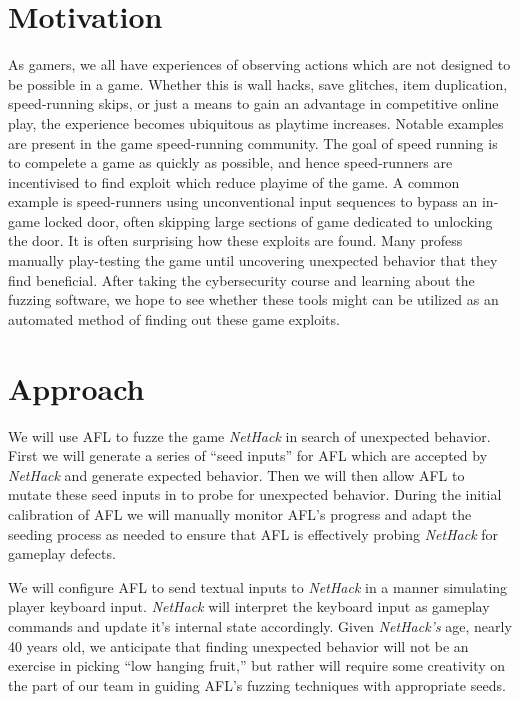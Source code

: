 \documentclass[12pt]{diazessay}
\begin{document}
\clearpage


\section*{Motivation}

As gamers, we all have experiences of observing actions which are not designed to be possible in a game.
Whether this is wall hacks, save glitches, item duplication, speed-running skips, or just a means to gain an advantage in competitive online play, the experience becomes ubiquitous as playtime increases.
Notable examples are present in the game speed-running community.
The goal of speed running is to compelete a game as quickly as possible, and hence speed-runners are incentivised to find exploit which reduce playime of the game.
A common example is speed-runners using unconventional input sequences to bypass an in-game locked door, often skipping large sections of game dedicated to unlocking the door.
It is often surprising how these exploits are found.
Many profess manually play-testing the game until uncovering unexpected behavior that they find beneficial.
After taking the cybersecurity course and learning about the fuzzing software, we hope to see whether these tools might can be utilized as an automated method of finding out these game exploits.


\section*{Approach}

We will use AFL to fuzze the game \emph{NetHack} in search of unexpected behavior.
First we will generate a series of ``seed inputs'' for AFL which are accepted by \emph{NetHack} and generate expected behavior.
Then we will then allow AFL to mutate these seed inputs in to probe for unexpected behavior.
During the initial calibration of AFL we will manually monitor AFL's progress and adapt the seeding process as needed to ensure that AFL is effectively probing \emph{NetHack} for gameplay defects.

We will configure AFL to send textual inputs to \emph{NetHack} in a manner simulating player keyboard input.
\emph{NetHack} will interpret the keyboard input as gameplay commands and update it's internal state accordingly.
Given \emph{NetHack's} age, nearly 40 years old, we anticipate that finding unexpected behavior will not be an exercise in picking ``low hanging fruit,'' but rather will require some creativity on the part of our team in guiding AFL's fuzzing techniques with appropriate seeds.
\end{document}
